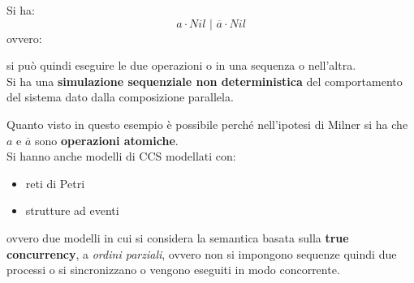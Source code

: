 \begin{esempio}
  Si ha:
  \[a\cdot Nil\,\,|\,\,\overline{a}\cdot Nil\]
  ovvero:
  \begin{center}
  \end{center}
  si può quindi eseguire le due operazioni o in una sequenza o nell'altra.\\
  Si ha una \textbf{simulazione sequenziale non deterministica} del
  comportamento del sistema dato dalla composizione parallela.
\end{esempio}
Quanto visto in questo esempio è possibile perché nell'ipotesi di Milner si ha
che $a$ e $\overline{a}$ sono \textbf{operazioni atomiche}.\\
Si hanno anche modelli di CCS modellati con:
\begin{itemize}
  \item reti di Petri
  \item strutture ad eventi
\end{itemize}
ovvero due modelli in cui si considera la semantica basata sulla \textbf{true
  concurrency}, a \textit{ordini parziali}, ovvero non si impongono sequenze
quindi due processi o si sincronizzano o vengono eseguiti in modo concorrente.
